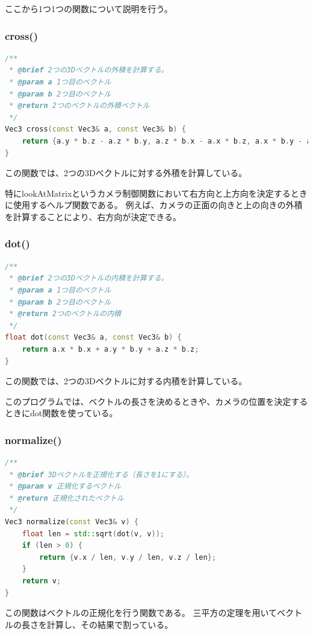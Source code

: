 \documentclass[upIatex,dvipdfmx,a4paper]{jsarticle}
\begin{document}
ここから1つ1つの関数について説明を行う。
\subsubsection{cross()}
\begin{lstlisting}[language=C++, caption={cross() 関数}, label={lst:cross}]
/**
 * @brief 2つの3Dベクトルの外積を計算する。
 * @param a 1つ目のベクトル
 * @param b 2つ目のベクトル
 * @return 2つのベクトルの外積ベクトル
 */
Vec3 cross(const Vec3& a, const Vec3& b) {
    return {a.y * b.z - a.z * b.y, a.z * b.x - a.x * b.z, a.x * b.y - a.y * b.x};
}
\end{lstlisting}

この関数では、2つの3Dベクトルに対する外積を計算している。

特にlookAtMatrixというカメラ制御関数において右方向と上方向を決定するときに使用するヘルプ関数である。
例えば、カメラの正面の向きと上の向きの外積を計算することにより、右方向が決定できる。
\subsubsection{dot()}
\begin{lstlisting}[language=C++, caption={dot() 関数 (3Dベクトル版)}, label={lst:dot}]
/**
 * @brief 2つの3Dベクトルの内積を計算する。
 * @param a 1つ目のベクトル
 * @param b 2つ目のベクトル
 * @return 2つのベクトルの内積
 */
float dot(const Vec3& a, const Vec3& b) {
    return a.x * b.x + a.y * b.y + a.z * b.z;
}
\end{lstlisting}
この関数では、2つの3Dベクトルに対する内積を計算している。

このプログラムでは、ベクトルの長さを決めるときや、カメラの位置を決定するときにdot関数を使っている。

\subsubsection{normalize()}
\begin{lstlisting}[language=C++, caption={normalize() 関数}, label={lst:normalize}]
/**
 * @brief 3Dベクトルを正規化する（長さを1にする）。
 * @param v 正規化するベクトル
 * @return 正規化されたベクトル
 */
Vec3 normalize(const Vec3& v) {
    float len = std::sqrt(dot(v, v));
    if (len > 0) {
        return {v.x / len, v.y / len, v.z / len};
    }
    return v;
}
\end{lstlisting}

この関数はベクトルの正規化を行う関数である。
三平方の定理を用いてベクトルの長さを計算し、その結果で割っている。
\end{document}
